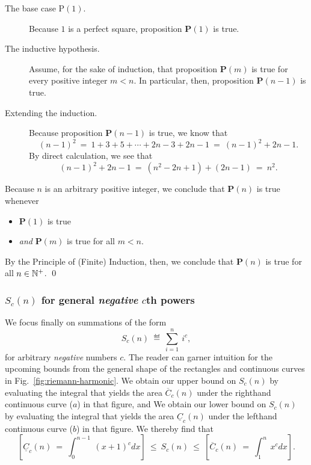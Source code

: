\begin{description}
\item[{\small\sf The base case P$(1)$}.]
%
Because $1$ is a perfect square, proposition {\bf P}$(1)$ is true.

\item[{\small\sf The inductive hypothesis}.]
%
Assume, for the sake of induction, that proposition {\bf P}$(m)$ is
true for every positive integer $m < n$.  In particular, then,
proposition {\bf P}$(n-1)$ is true.

\item[{\small\sf Extending the induction}.]
%
Because proposition {\bf P}$(n-1)$ is true, we know that
\[ (n-1)^2 \ = \
 1 + 3 + 5 + \cdots + 2n-3 + 2n-1 \ = \ (n-1)^2 + 2n-1.  \]
By direct calculation, we see that
\[ (n-1)^2 + 2n-1 \ = \ (n^2 -2n +1) + (2n-1) \ = \ n^2. \]
\end{description}
Because $n$ is an arbitrary positive integer, we conclude that
{\bf P}$(n)$ is true whenever
\begin{itemize}
\item
{\bf P}$(1)$ is true
\item
{\em and}
{\bf P}$(m)$ is true for all $m < n$.
\end{itemize}
By the Principle of (Finite) Induction, then, we conclude that {\bf
  P}$(n)$ is true for all $n \in \mathbb{N}^+$.
\qed


\subsubsection{$S_c(n)$ for general {\em negative} $c$th powers}
\label{sec:sum-of-i2c<0}

We focus finally on summations of the form
\[ S_c(n) \ \eqdef \ \sum_{i=1}^n \ i^c, \]
for arbitrary {\em negative} numbers $c$.  The reader can garner
intuition for the upcoming bounds from the general shape of the
rectangles and continuous curves in Fig.~\ref{fig:riemann-harmonic}.
We obtain our upper bound on $S_c(n)$ by evaluating the integral that
yields the area $\overline{C}_c(n)$ under the righthand continuous
curve ($a$) in that figure, and We obtain our lower bound on $S_c(n)$
by evaluating the integral that yields the area $\underline{C}_c(n)$
under the lefthand continuous curve ($b$) in that figure.  We thereby
find that
\begin{equation} 
\label{eq:general-bounds-negative-xc}
\left[
\underline{C}_c(n) \ = \
\int_0^{n-1} \ (x+1)^c dx
\right]
\ \leq \ S_c(n) \ \leq \
\left[
\overline{C}_c(n) \ = \
\int_1^n \ x^c dx
\right].
\end{equation}

